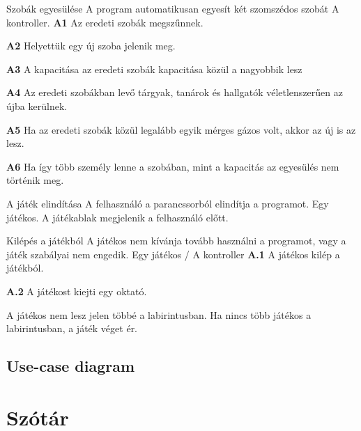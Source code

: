 \begin{use-case}
	{Szobák egyesülése}
	{A program automatikusan egyesít két szomszédos szobát}
	{A kontroller.}
    \textbf{A1} Az eredeti szobák megszűnnek.
    
    \textbf{A2} Helyettük egy új szoba jelenik meg.
    
    \textbf{A3} A kapacitása az eredeti szobák kapacitása közül a nagyobbik lesz

     
    \textbf{A4} Az eredeti szobákban levő tárgyak, tanárok és hallgatók véletlenszerűen az újba kerülnek.

    
    \textbf{A5} Ha az eredeti szobák közül legalább egyik mérges gázos volt, akkor az új is az lesz. 

    \textbf{A6} Ha így több személy lenne a szobában, mint a kapacitás az egyesülés nem történik meg.
\end{use-case}
\begin{use-case}
	{A játék elindítása}
	{A felhasználó a parancssorból elindítja a programot.}
	{Egy játékos.}
    {A játékablak megjelenik a felhasználó előtt.}
\end{use-case}
\begin{use-case}
	{Kilépés a játékból}
	{A játékos nem kívánja tovább használni a programot, vagy a játék szabályai nem engedik.}
	{Egy játékos / A kontroller}
        \textbf{A.1} A játékos kilép a játékból.
        
        \textbf{A.2} A játékost kiejti egy oktató.

        A játékos nem lesz jelen többé a labirintusban. Ha nincs több játékos a labirintusban, a játék véget ér.
\end{use-case}




\subsection{Use-case diagram}


\section{Szótár}

